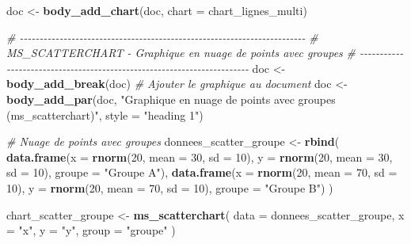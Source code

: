 \documentclass[
]{article}
\newenvironment{Shaded}{\begin{snugshade}}{\end{snugshade}}
\newcommand{\AttributeTok}[1]{\textcolor[rgb]{0.13,0.29,0.53}{#1}}
\newcommand{\CommentTok}[1]{\textcolor[rgb]{0.56,0.35,0.01}{\textit{#1}}}
\newcommand{\DecValTok}[1]{\textcolor[rgb]{0.00,0.00,0.81}{#1}}
\newcommand{\FunctionTok}[1]{\textcolor[rgb]{0.13,0.29,0.53}{\textbf{#1}}}
\newcommand{\NormalTok}[1]{#1}
\newcommand{\OtherTok}[1]{\textcolor[rgb]{0.56,0.35,0.01}{#1}}
\newcommand{\StringTok}[1]{\textcolor[rgb]{0.31,0.60,0.02}{#1}}
\begin{document}
\begin{Shaded}
\begin{Highlighting}[]
\NormalTok{doc }\OtherTok{\textless{}{-}} \FunctionTok{body\_add\_chart}\NormalTok{(doc, }\AttributeTok{chart =}\NormalTok{ chart\_lignes\_multi)}


\CommentTok{\# {-}{-}{-}{-}{-}{-}{-}{-}{-}{-}{-}{-}{-}{-}{-}{-}{-}{-}{-}{-}{-}{-}{-}{-}{-}{-}{-}{-}{-}{-}{-}{-}{-}{-}{-}{-}{-}{-}{-}{-}{-}{-}{-}{-}{-}{-}{-}{-}{-}{-}{-}{-}{-}{-}{-}{-}{-}{-}{-}{-}{-}{-}{-}{-}{-}{-}{-}{-}{-}{-}{-}{-}}
\CommentTok{\# MS\_SCATTERCHART {-} Graphique en nuage de points avec groupes}
\CommentTok{\# {-}{-}{-}{-}{-}{-}{-}{-}{-}{-}{-}{-}{-}{-}{-}{-}{-}{-}{-}{-}{-}{-}{-}{-}{-}{-}{-}{-}{-}{-}{-}{-}{-}{-}{-}{-}{-}{-}{-}{-}{-}{-}{-}{-}{-}{-}{-}{-}{-}{-}{-}{-}{-}{-}{-}{-}{-}{-}{-}{-}{-}{-}{-}{-}{-}{-}{-}{-}{-}{-}{-}{-}}
\NormalTok{doc }\OtherTok{\textless{}{-}} \FunctionTok{body\_add\_break}\NormalTok{(doc)}
\CommentTok{\# Ajouter le graphique au document}
\NormalTok{doc }\OtherTok{\textless{}{-}} \FunctionTok{body\_add\_par}\NormalTok{(doc, }\StringTok{"Graphique en nuage de points avec groupes (ms\_scatterchart)"}\NormalTok{, }\AttributeTok{style =} \StringTok{"heading 1"}\NormalTok{)}

\CommentTok{\# Nuage de points avec groupes}
\NormalTok{donnees\_scatter\_groupe }\OtherTok{\textless{}{-}} \FunctionTok{rbind}\NormalTok{(}
  \FunctionTok{data.frame}\NormalTok{(}\AttributeTok{x =} \FunctionTok{rnorm}\NormalTok{(}\DecValTok{20}\NormalTok{, }\AttributeTok{mean =} \DecValTok{30}\NormalTok{, }\AttributeTok{sd =} \DecValTok{10}\NormalTok{), }
             \AttributeTok{y =} \FunctionTok{rnorm}\NormalTok{(}\DecValTok{20}\NormalTok{, }\AttributeTok{mean =} \DecValTok{30}\NormalTok{, }\AttributeTok{sd =} \DecValTok{10}\NormalTok{), }
             \AttributeTok{groupe =} \StringTok{"Groupe A"}\NormalTok{),}
  \FunctionTok{data.frame}\NormalTok{(}\AttributeTok{x =} \FunctionTok{rnorm}\NormalTok{(}\DecValTok{20}\NormalTok{, }\AttributeTok{mean =} \DecValTok{70}\NormalTok{, }\AttributeTok{sd =} \DecValTok{10}\NormalTok{), }
             \AttributeTok{y =} \FunctionTok{rnorm}\NormalTok{(}\DecValTok{20}\NormalTok{, }\AttributeTok{mean =} \DecValTok{70}\NormalTok{, }\AttributeTok{sd =} \DecValTok{10}\NormalTok{), }
             \AttributeTok{groupe =} \StringTok{"Groupe B"}\NormalTok{)}
\NormalTok{)}

\NormalTok{chart\_scatter\_groupe }\OtherTok{\textless{}{-}} \FunctionTok{ms\_scatterchart}\NormalTok{(}
  \AttributeTok{data =}\NormalTok{ donnees\_scatter\_groupe,}
  \AttributeTok{x =} \StringTok{"x"}\NormalTok{,}
  \AttributeTok{y =} \StringTok{"y"}\NormalTok{,}
  \AttributeTok{group =} \StringTok{"groupe"}
\NormalTok{)}



\end{Highlighting}
\end{Shaded}
\end{document}

